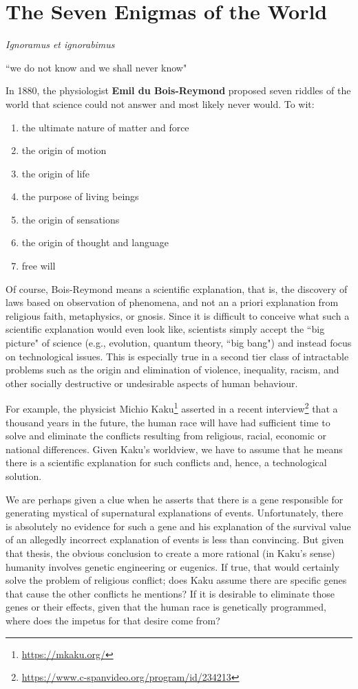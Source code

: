 \section{The Seven Enigmas of the World}

\begin{quotex}
\textit{Ignoramus et ignorabimus}

``we do not know and we shall never know"
\end{quotex}

In 1880, the physiologist \textbf{Emil du Bois-Reymond} proposed seven riddles of the world that science could not
answer and most likely never would. To wit:

\begin{enumerate}
\item the ultimate nature of matter and force 
\item the origin of motion 
\item the origin of life 
\item the purpose of living beings 
\item the origin of sensations 
\item the origin of thought and language 
\item free will 
\end{enumerate}
Of course, Bois-Reymond means a scientific explanation, that is, the discovery of laws based on observation of
phenomena, and not an a priori explanation from religious faith, metaphysics, or gnosis. Since it is difficult to
conceive what such a scientific explanation would even look like, scientists simply accept the ``big picture" of science
(e.g., evolution, quantum theory, ``big bang") and instead focus on technological issues. This is especially true in a
second tier class of intractable problems such as the origin and elimination of violence, inequality, racism, and other
socially destructive or undesirable aspects of human behaviour.

For example, the physicist Michio Kaku\footnote{\url{https://mkaku.org/}} asserted in a recent interview\footnote{\url{https://www.c-spanvideo.org/program/id/234213}} that a thousand years in the future, the human
race will have had sufficient time to solve and eliminate the conflicts resulting from religious, racial, economic or
national differences. Given Kaku's worldview, we have to assume that he means there is a
scientific explanation for such conflicts and, hence, a technological solution.

We are perhaps given a clue when he asserts that there is a gene responsible for generating mystical of supernatural
explanations of events. Unfortunately, there is absolutely no evidence for such a gene and his explanation of the
survival value of an allegedly incorrect explanation of events is less than convincing. But given that thesis, the
obvious conclusion to create a more rational (in Kaku's sense) humanity involves genetic
engineering or eugenics. If true, that would certainly solve the problem of religious conflict; does Kaku assume there
are specific genes that cause the other conflicts he mentions? If it is desirable to eliminate those genes or their
effects, given that the human race is genetically programmed, where does the impetus for that desire come from?

